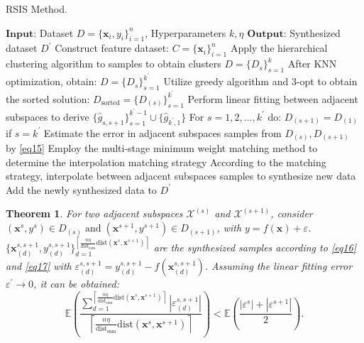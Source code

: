 \documentclass[final,3p,times]{elsarticle}
\newtheorem{theorem}{Theorem}
\begin{document}
\begin{algorithm}[h!]
  \caption{RSIS Method.}\label{alg:alg3}
  \begin{algorithmic}
  \STATE 
  \STATE $\mathbf{Input}$: Dataset $D=\{\boldsymbol{x}_i,y_i \}_{i=1}^n$,
  Hyperparameters $k,\eta$
  \STATE $\mathbf{Output}$: Synthesized dataset $D^\prime$
  \vspace{5pt} %
  \STATE Construct feature dataset: $C=\{\boldsymbol{x}_i\}_{i=1}^n$
  \STATE Apply the hierarchical clustering algorithm to samples to obtain clusters $D=\{D_s\}_{s=1}^{k}$
  \STATE After KNN optimization, obtain: $D=\{D_s\}_{s=1}^{k^\prime}$
  \STATE Utilize greedy algorithm and 3-opt to obtain the sorted solution: $D_{\text{sorted}}=\{D_{(s)}\}_{s=1}^{k^\prime}$
  \STATE Perform linear fitting between adjacent subspaces to derive $\{\hat{g}_{s,s+1}\}_{s=1}^{k^\prime-1}\cup\{\hat{g}_{k^\prime,1}\}$
  \STATE For $s=1,2,\ldots,k^\prime$ do:
  {\STATE \hspace{0.5cm}$D_{(s+1)}=D_{(1)}$ if $s=k^\prime$}
  \STATE \hspace{0.5cm}Estimate the error in adjacent subspaces samples from $D_{(s)},D_{(s+1)}$ by \eqref{eq15}
  \STATE \hspace{0.5cm}Employ the multi-stage minimum weight matching method to determine the interpolation matching strategy
  \STATE \hspace{0.5cm}According to the matching strategy, interpolate between adjacent subspaces samples to synthesize 
new data
  \STATE \hspace{0.5cm}Add the newly synthesized data to $D^\prime$
  \end{algorithmic}
  \label{Alg3}
\end{algorithm}

\begin{theorem}
\label{the4}
For two adjacent subspaces $\mathcal{X}^{(s)}$ and 
$\mathcal{X}^{(s+1)}$, consider $(\boldsymbol{x}^s,{y}^s)\in D_{(s)}
\;\text{and}\; (\boldsymbol{x}^{s+1},{y}^{s+1})\in D_{(s+1)}$, 
with ${y}=f(\boldsymbol{x})+\varepsilon$. $\{\boldsymbol{x}_{(d)}
^{s,s+1},y_{(d)}^{s,s+1} \}_{d=1}^{\left\lceil \frac{n\eta }
{\text{dist}_{\text{sum}}}\text{dist}(\boldsymbol{x}^s,\boldsymbol
{x}^{s+1})\right\rceil}$ are the synthesized samples according to 
\eqref{eq16} and \eqref{eq17} with $\varepsilon^{s,s+1}_{(d)}=
y_{(d)}^{s,s+1}-f(\boldsymbol{x}_{(d)}^{s,s+1})$. Assuming the 
linear fitting error $\varepsilon^\prime\rightarrow0$, it can be 
obtained:
\begin{equation*}
\mathbb{E}(\frac{\textstyle\sum_{d=1}^{{\left\lceil \frac{n\eta }{\text{dist}_{\text{sum}}}\text{dist}(\boldsymbol{x}^s,\boldsymbol{x}^{s+1})\right\rceil}}{|\varepsilon^{s,s+1}_{(d)}|}}{\left\lceil \frac{n\eta }{\text{dist}_{\text{sum}}}\text{dist}(\boldsymbol{x}^s,\boldsymbol{x}^{s+1})\right\rceil})<\mathbb{E}(\frac{|\varepsilon^s|+|\varepsilon^{s+1}|}{2}).
\end{equation*}
\end{theorem}
\end{document}
